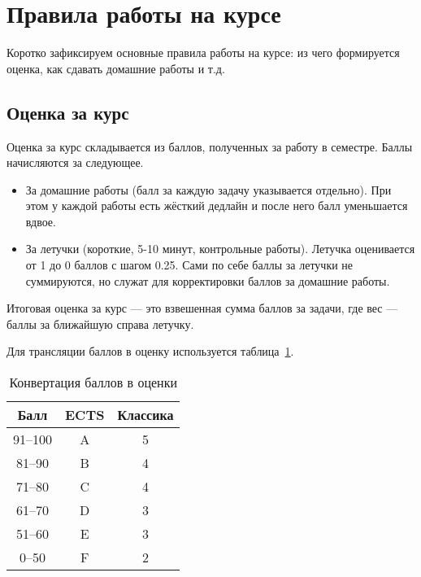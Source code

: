 \section{Правила работы на курсе}

Коротко зафиксируем основные правила работы на курсе: из чего формируется оценка, как сдавать домашние работы и т.д.

\subsection{Оценка за курс}

Оценка за курс складывается из баллов, полученных за работу в семестре. Баллы начисляются за следующее.
\begin{itemize}
    \item За домашние работы (балл за каждую задачу указывается отдельно). При этом у каждой работы есть жёсткий дедлайн и после него балл уменьшается вдвое.
    \item За летучки (короткие, 5-10 минут, контрольные работы). Летучка оценивается от 1 до 0 баллов с шагом 0.25. Сами по себе баллы за летучки не суммируются, но служат для корректировки баллов за домашние работы.
\end{itemize}

Итоговая оценка за курс --- это взвешенная сумма баллов за задачи, где вес --- баллы за ближайшую справа летучку.

Для трансляции баллов в оценку используется таблица~\ref{tbl:ects}.

\begin{table}[h]
    \caption{Конвертация баллов в оценки}
    \label{tbl:ects}
\begin{center}
    \begin{tabular}{ | c | c | c |}
        \hline
        Балл & ECTS & Классика \\ 
        \hline
        \hline
        91--100 & A & 5 \\  
        81--90  & B & 4 \\  
        71--80  & C & 4 \\  
        61--70  & D & 3 \\  
        51--60  & E & 3 \\  
         0--50  & F & 2 \\   
        \hline
    \end{tabular}
\end{center}
\end{table}

